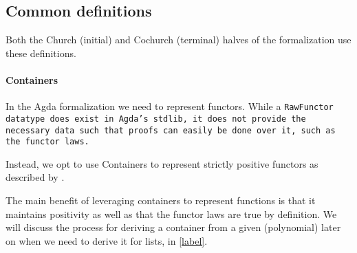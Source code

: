 \subsection{Common definitions}
Both the Church (initial) and Cochurch (terminal) halves of the formalization use these definitions.


\paragraph{Containers}
In the Agda formalization we need to represent functors.
While a \tt{RawFunctor} datatype does exist in Agda's stdlib, it does not provide the necessary data such that proofs can easily be done over it, such as the functor laws.

Instead, we opt to use Containers to represent strictly positive functors as described by \cite{Abbott2005}.


The main benefit of leveraging containers to represent functions is that it maintains positivity as well as that the functor laws are true by definition.
We will discuss the process for deriving a container from a given (polynomial) later on when we need to derive it for lists, in \autoref{label}.


